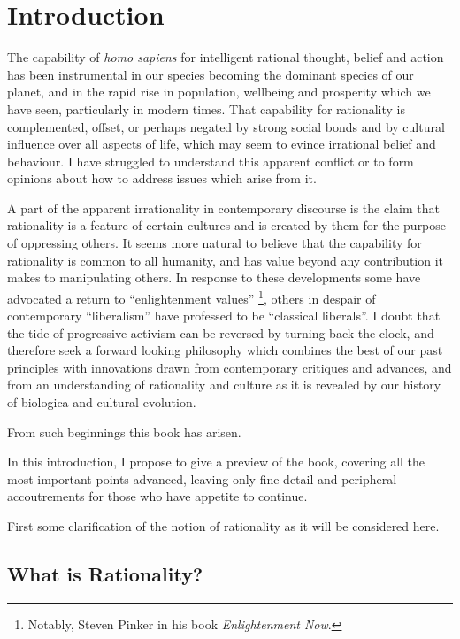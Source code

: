 \mainmatter
\chapter{Introduction }

The capability of \emph{homo sapiens} for intelligent rational thought, belief and action has been instrumental in our species becoming the dominant species of our planet, and in the rapid rise in population, wellbeing and prosperity which we have seen, particularly in modern times.
That capability for rationality is complemented, offset, or perhaps negated by strong social bonds and by cultural influence over all aspects of life, which may seem to evince irrational belief and behaviour.
I have struggled to understand this apparent conflict or to form opinions about how to address issues which arise from it.

A part of the apparent irrationality in contemporary discourse is the claim that rationality is a feature of certain cultures and is created by them for the purpose of oppressing others.
It seems more natural to believe that the capability for rationality is common to all humanity, and has value beyond any contribution it makes to manipulating others.
In response to these developments some have advocated a return to ``enlightenment values'' \footnote{Notably, Steven Pinker in his book \emph{Enlightenment Now}\cite{pinker-en}.}, others in despair of contemporary ``liberalism'' have professed to be ``classical liberals''.
I doubt that the tide of progressive activism can be reversed by turning back the clock, and therefore seek a forward looking philosophy which combines the best of our past principles with innovations drawn from contemporary critiques and advances, and from an understanding of rationality and culture as it is revealed by our history of biologica and cultural evolution.

From such beginnings this book has arisen.

In this introduction, I propose to give a preview of the book, covering all the most important points advanced, leaving only fine detail and peripheral accoutrements for those who have appetite to continue.

First some clarification of the notion of rationality as it will be considered here.

\section{What is Rationality?}

